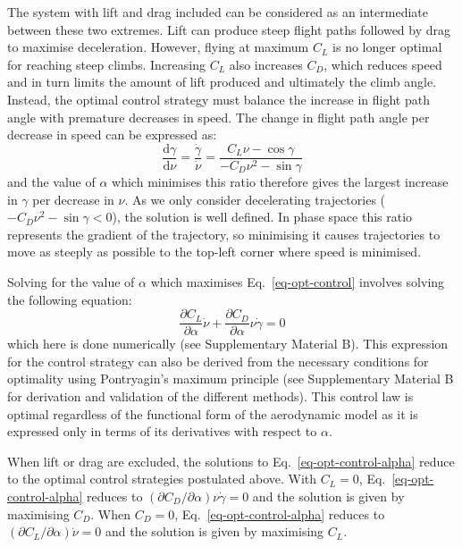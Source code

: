 The system with lift and drag included can be considered as an intermediate between these two extremes. Lift can produce steep flight paths followed by drag to maximise deceleration. However, flying at maximum $C_L$ is no longer optimal for reaching steep climbs. Increasing $C_L$ also increases $C_D$, which reduces speed and in turn limits the amount of lift produced and ultimately the climb angle. Instead, the optimal control strategy must balance the increase in flight path angle with premature decreases in speed. The change in flight path angle per decrease in speed can be expressed as:
\begin{equation}
  \frac{\mathrm{d}\gamma}{\mathrm{d}\nu}
  = \frac{\dot{\gamma}}{\dot{\nu}}
  = \frac{C_L \nu - \cos\gamma}{-C_D \nu^2 - \sin\gamma}
  \label{eq-opt-control}
\end{equation}
and the value of $\alpha$ which minimises this ratio therefore gives the largest increase in $\gamma$ per decrease in $\nu$. As we only consider decelerating trajectories ($-C_D\nu^2-\sin\gamma<0$), the solution is well defined. In phase space this ratio represents the gradient of the trajectory, so minimising it causes trajectories to move as steeply as possible to the top-left corner where speed is minimised.

Solving for the value of $\alpha$ which maximises Eq.~\eqref{eq-opt-control} involves solving the following equation:
\begin{equation}
  \frac{\partial C_L}{\partial \alpha}\dot{\nu}
  + \frac{\partial C_D}{\partial \alpha}\nu\dot{\gamma}=0
  \label{eq-opt-control-alpha}
\end{equation}
which here is done numerically (see Supplementary Material B). This expression for the control strategy can also be derived from the necessary conditions for optimality using Pontryagin's maximum principle \cite{kirkOptimalControlTheory2004} (see Supplementary Material B for derivation and validation of the different methods). This control law is optimal regardless of the functional form of the aerodynamic model as it is expressed only in terms of its derivatives with respect to $\alpha$.

When lift or drag are excluded, the solutions to Eq.~\eqref{eq-opt-control-alpha} reduce to the optimal control strategies postulated above. With $C_L=0$, Eq.~\eqref{eq-opt-control-alpha} reduces to $(\partial C_D/\partial\alpha)\nu\dot{\gamma}=0$ and the solution is given by maximising $C_D$. When $C_D=0$, Eq.~\eqref{eq-opt-control-alpha} reduces to $(\partial C_L/\partial\alpha)\dot{\nu}=0$ and the solution is given by maximising $C_L$.

